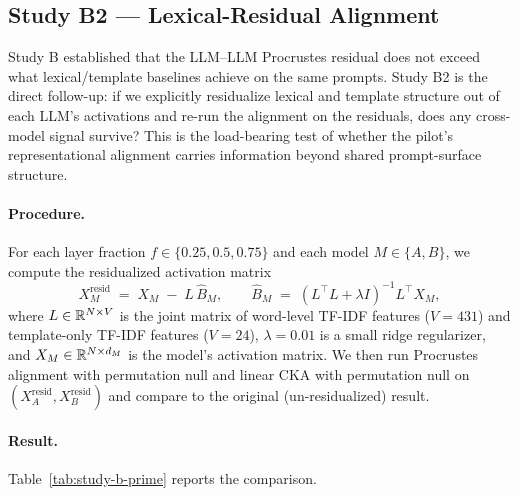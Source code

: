 \subsection{Study B2 — Lexical-Residual Alignment}
\label{sec:results-study-b-prime}

Study B established that the LLM--LLM Procrustes residual does not
exceed what lexical/template baselines achieve on the same prompts.
Study B2 is the direct follow-up: if we explicitly residualize
lexical and template structure out of each LLM's activations and
re-run the alignment on the residuals, does any cross-model signal
survive? This is the load-bearing test of whether the pilot's
representational alignment carries information beyond shared
prompt-surface structure.

\paragraph{Procedure.} For each layer fraction $f \in \{0.25, 0.5,
0.75\}$ and each model $M \in \{A, B\}$, we compute the residualized
activation matrix
\begin{equation}
X_M^{\text{resid}} \;=\; X_M \;-\; L\,\hat{B}_M, \qquad
\hat{B}_M \;=\; (L^\top L + \lambda I)^{-1} L^\top X_M,
\label{eq:residualize}
\end{equation}
where $L \in \mathbb{R}^{N \times V}$ is the joint matrix of word-level TF-IDF
features ($V = 431$) and template-only TF-IDF features ($V = 24$),
$\lambda = 0.01$ is a small ridge regularizer, and $X_M \in
\mathbb{R}^{N \times d_M}$ is the model's activation matrix. We then run
Procrustes alignment with permutation null and linear CKA with
permutation null on $(X_A^{\text{resid}}, X_B^{\text{resid}})$ and
compare to the original (un-residualized) result.

\paragraph{Result.} Table~\ref{tab:study-b-prime} reports the
comparison.

